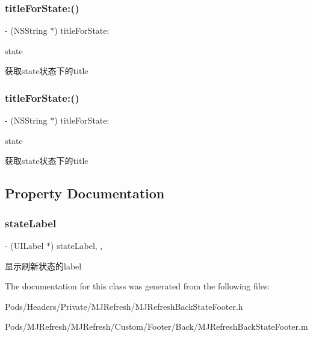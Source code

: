 \subsubsection{\texorpdfstring{title\+For\+State\+:()}{titleForState:()}\hspace{0.1cm}{\footnotesize\ttfamily [2/3]}}
{\footnotesize\ttfamily -\/ (N\+S\+String $\ast$) title\+For\+State\+: \begin{DoxyParamCaption}\item[{(M\+J\+Refresh\+State)}]{state }\end{DoxyParamCaption}}

获取state状态下的title \mbox{\label{interface_m_j_refresh_back_state_footer_a7c801452fb33298447430304f0fe75cf}} 
\subsubsection{\texorpdfstring{title\+For\+State\+:()}{titleForState:()}\hspace{0.1cm}{\footnotesize\ttfamily [3/3]}}
{\footnotesize\ttfamily -\/ (N\+S\+String $\ast$) title\+For\+State\+: \begin{DoxyParamCaption}\item[{(M\+J\+Refresh\+State)}]{state }\end{DoxyParamCaption}}

获取state状态下的title 

\subsection{Property Documentation}
\mbox{\label{interface_m_j_refresh_back_state_footer_a1e2117848e4440866614f42fc2950239}} 
\subsubsection{\texorpdfstring{state\+Label}{stateLabel}}
{\footnotesize\ttfamily -\/ (U\+I\+Label $\ast$) state\+Label\hspace{0.3cm}{\ttfamily [read]}, {\ttfamily [nonatomic]}, {\ttfamily [weak]}}

显示刷新状态的label 

The documentation for this class was generated from the following files\+:\begin{DoxyCompactItemize}
\item 
Pods/\+Headers/\+Private/\+M\+J\+Refresh/M\+J\+Refresh\+Back\+State\+Footer.\+h\item 
Pods/\+M\+J\+Refresh/\+M\+J\+Refresh/\+Custom/\+Footer/\+Back/M\+J\+Refresh\+Back\+State\+Footer.\+m\end{DoxyCompactItemize}
